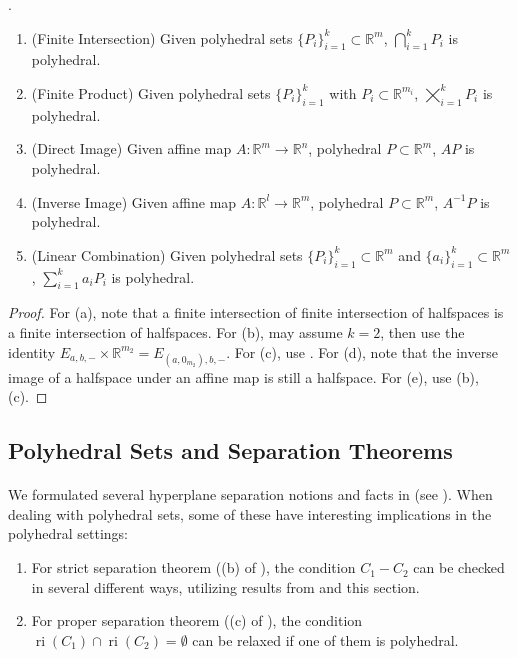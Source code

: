 \begin{prop}\label{prop:017-polyhedral-yoga}.
	\begin{enumerate}[label=(\alph*)]
		\item (Finite Intersection) Given polyhedral sets $\{P_i\}_{i=1}^{k}\subset \mathbb{R}^m$, $\bigcap_{i=1}^kP_i$ is polyhedral.
		\item (Finite Product) Given polyhedral sets $\{P_i\}_{i=1}^{k}$ with $P_i\subset \mathbb{R}^{m_i}$, $\bigtimes_{i=1}^kP_i$ is polyhedral.
		\item (Direct Image) Given affine map $A:\mathbb{R}^m\to \mathbb{R}^n$, polyhedral $P\subset \mathbb{R}^m$, $AP$ is polyhedral.
		\item (Inverse Image) Given affine map $A:\mathbb{R}^l\to \mathbb{R}^m$, polyhedral $P\subset \mathbb{R}^m$, $A^{-1}P$ is polyhedral.
		\item (Linear Combination) Given polyhedral sets $\{P_i\}_{i=1}^{k}\subset \mathbb{R}^m$ and $\{a_i\}_{i=1}^k\subset \mathbb{R}^m$, $\sum_{i=1}^ka_iP_i$ is polyhedral.
	\end{enumerate}
\end{prop}
\begin{proof}
	For (a), note that a finite intersection of finite intersection of halfspaces is a finite intersection of halfspaces. For (b), may assume $k=2$, then use the identity $E_{a,b,-}\times \mathbb{R}^{m_2}=E_{(a,0_{m_2}),b,-}$. For (c), use . For (d), note that the inverse image of a halfspace under an affine map is still a halfspace. For (e), use (b), (c).
\end{proof}

\subsection{Polyhedral Sets and Separation Theorems}

\paragraph{}We formulated several hyperplane separation notions and facts in  (see ). When dealing with polyhedral sets, some of these have interesting implications in the polyhedral settings:

\begin{enumerate}[label=(\arabic*)]
	\item For strict separation theorem ((b) of ), the condition $C_1-C_2$ can be checked in several different ways, utilizing results from  and this section.
	\item For proper separation theorem ((c) of ), the condition $\operatorname{ri}(C_1)\cap\operatorname{ri}(C_2)=\emptyset$ can be relaxed if one of them is polyhedral.
\end{enumerate}


